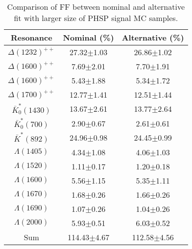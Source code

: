 \begin{table}[H]
    \centering 
    \caption{Comparison of FF between nominal and alternative fit with larger size of PHSP signal MC samples.}
    \label{tab:mc_stat_comp_2}
\begin{tabular}{c|c|c}
\hline\hline
Resonance & Nominal (\%) & Alternative (\%) \\\hline
$\Delta(1232)^{++}$ & 27.32$\pm$1.03 & 26.86$\pm$1.02\\
$\Delta(1600)^{++}$ & 7.69$\pm$2.01 & 7.70$\pm$1.91\\
$\Delta(1600)^{++}$ & 5.43$\pm$1.88 & 5.34$\pm$1.72\\
$\Delta(1700)^{++}$ & 12.77$\pm$1.41 & 12.51$\pm$1.44\\
$\bar{K}_{0}^{*}(1430)$ & 13.67$\pm$2.61 & 13.77$\pm$2.64\\
$\bar{K}_{0}^{*}(700)$ & 2.90$\pm$0.67 & 2.61$\pm$0.61\\
$\bar{K}^{*}(892)$ & 24.96$\pm$0.98 & 24.45$\pm$0.99\\
$\Lambda(1405)$ & 4.34$\pm$1.08 & 4.06$\pm$1.03\\
$\Lambda(1520)$ & 1.11$\pm$0.17 & 1.20$\pm$0.18\\
$\Lambda(1600)$ & 5.56$\pm$1.15 & 5.35$\pm$1.11\\
$\Lambda(1670)$ & 1.68$\pm$0.26 & 1.66$\pm$0.26\\
$\Lambda(1690)$ & 1.07$\pm$0.26 & 1.04$\pm$0.26\\
$\Lambda(2000)$ & 5.93$\pm$0.51 & 6.03$\pm$0.52\\\hline 
Sum & 114.43$\pm$4.67 & 112.58$\pm$4.56\\
\hline\hline
\end{tabular}
\end{table}
